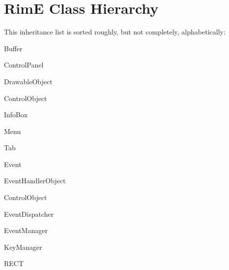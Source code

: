 \section{Rim\-E Class Hierarchy}
This inheritance list is sorted roughly, but not completely, alphabetically:\begin{CompactList}
\item Buffer\item Control\-Panel\item Drawable\-Object\begin{CompactList}
\item Control\-Object\begin{CompactList}
\item Info\-Box\item Menu\item Tab\end{CompactList}
\end{CompactList}
\item Event\item Event\-Handler\-Object\begin{CompactList}
\item Control\-Object\item Event\-Dispatcher\end{CompactList}
\item Event\-Manager\begin{CompactList}
\item Key\-Manager\end{CompactList}
\item RECT\end{CompactList}
